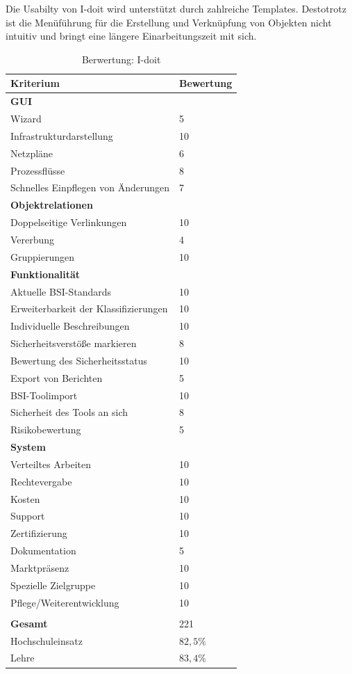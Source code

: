 Die Usabilty von I-doit wird unterstützt durch zahlreiche Templates. Destotrotz ist die Menüführung für die Erstellung und Verknüpfung von Objekten nicht intuitiv und bringt eine 
längere Einarbeitungszeit mit sich.

\begin{table}[h]
\begin{tabular}{|p{}|p{}|}
\hline
Kriterium & Bewertung\\
\hline
\textbf{GUI}& \\
\hline
Wizard & 5 \\
\hline
Infrastrukturdarstellung & 10 \\
\hline
Netzpläne & 6 \\
\hline
Prozessflüsse & 8 \\
\hline
Schnelles Einpflegen von Änderungen & 7 \\
\hline
\textbf{Objektrelationen} &  \\
\hline
Doppelseitige Verlinkungen & 10 \\
\hline
Vererbung & 4 \\
\hline
Gruppierungen & 10 \\
\hline
\textbf{Funktionalität} &\\
\hline
Aktuelle BSI-Standards & 10 \\
\hline
Erweiterbarkeit der Klassifizierungen & 10 \\
\hline
Individuelle Beschreibungen & 10 \\
\hline
Sicherheitsverstöße markieren & 8 \\
\hline
Bewertung des Sicherheitsstatus & 10 \\
\hline
Export von Berichten & 5 \\
\hline
BSI-Toolimport & 10 \\
\hline
Sicherheit des Tools an sich & 8 \\
\hline
Risikobewertung & 5 \\
\hline
\textbf{System}& \\
\hline
Verteiltes Arbeiten & 10 \\
\hline
Rechtevergabe & 10 \\
\hline
Kosten & 10 \\
\hline
Support & 10 \\
\hline
Zertifizierung & 10 \\
\hline
Dokumentation & 5 \\
\hline
Marktpräsenz & 10 \\
\hline
Spezielle Zielgruppe & 10 \\
\hline
Pflege/Weiterentwicklung & 10 \\
\hline
\multicolumn{2}{c}{}\\
\hline
\textbf{Gesamt} & 221\\
\hline
Hochschuleinsatz & $82,5\%$\\
\hline
Lehre & $83,4\%$\\
\hline
\end{tabular}
\caption{Berwertung: I-doit}
\label{tab:BerwertungIdoit}
\end{table}







